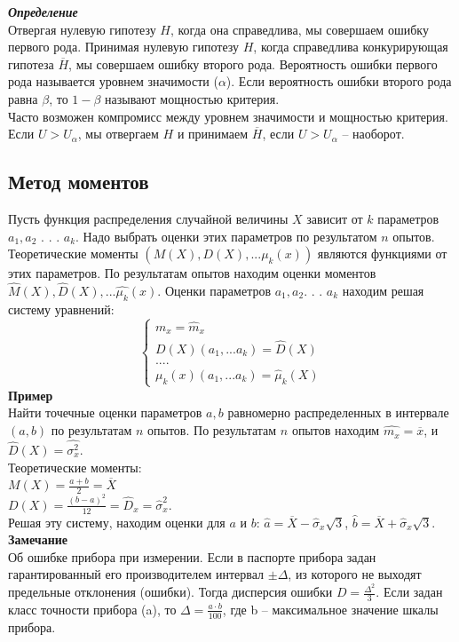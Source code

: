 \documentclass[russian, 12pt, fleqn]{article}
\begin{document}
\textit{\textbf{Определение}}\\
Отвергая нулевую гипотезу $H$, когда она справедлива, мы совершаем ошибку первого рода. Принимая нулевую гипотезу $H$, когда справедлива конкурирующая гипотеза 
 $\overline{H}$, мы совершаем ошибку второго рода. Вероятность ошибки первого рода называется уровнем значимости ($\alpha$). Если вероятность ошибки второго рода равна $\beta$, то $1 - \beta$ называют мощностью критерия.\\
Часто возможен компромисс между уровнем значимости и мощностью критерия. Если $U>U_{\alpha}$, мы отвергаем $H$ и принимаем $\overline{H}$, если $U>U_{\alpha}$ -- наоборот.
\subsection{Метод моментов}
Пусть функция распределения случайной величины $X$ зависит от $k$ параметров $a_1, a_2$ . . . $a_k$. Надо выбрать оценки этих параметров по результатом $n$ опытов. Теоретические моменты $(M(X), D(X), ... \mu_k(x))$ являются функциями от этих параметров. По результатам опытов находим оценки моментов  $\hat{M}(X),\hat{D}(X), ... \hat{\mu_k}(x)$.
Оценки параметров $a_1, a_2$. . . $a_k$ находим решая систему уравнений:\\
\begin{equation*} 
 \begin{cases}
  m_x = \hat{m}_x\\
  D(X) (a_1, ... a_k) = \hat{D}(X)\\
  ....\\
 \mu_k(x) (a_1, ... a_k) = \hat{\mu}_k(X)
 \end{cases}
\end{equation*}
\textbf{Пример}\\
Найти точечные оценки параметров $a, b$ равномерно распределенных в интервале $(a, b)$ по результатам $n$ опытов. По результатам $n$ опытов находим $\hat{m_x} = \overline{x}$, и $\hat{D}(X) = \hat{\sigma_x^2}$.\\
Теоретические моменты:\\
$M(X) = \frac{a + b}{2} = \overline{X}$\\
$D(X) = \frac{(b-a)^2}{12} = \hat{D}_x = \hat{\sigma}_x^2$.\\
Решая эту систему, находим оценки для $a$ и $b$: $\hat{a} = \overline{X} - \hat{\sigma}_{x} \sqrt{3}$,  $\hat{b} = \overline{X} + \hat{\sigma}_x \sqrt{3}$.\\
\textbf{Замечание\ } \\
Об ошибке прибора при  измерении. Если в паспорте прибора задан гарантированный его производителем интервал $\pm \Delta$, из которого не выходят предельные отклонения (ошибки).  Тогда дисперсия ошибки $D = \frac{\Delta^2}{3}$. Если задан класс точности прибора (a), то $\Delta = \frac{a \cdot b}{100}$, где b -- максимальное значение шкалы прибора.\\
\end{document}
